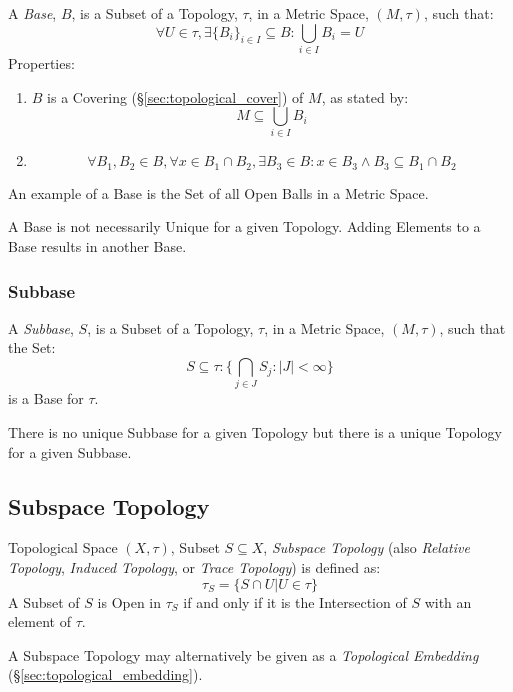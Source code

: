 A \emph{Base}, $B$, is a Subset of a Topology, $\tau$, in a Metric
Space, $(M,\tau)$, such that:
\[
  \forall U \in \tau, \exists \{B_i\}_{i \in I} \subseteq B :
  \bigcup_{i \in I}B_i = U
\]
Properties:
\begin{enumerate}
  \item $B$ is a Covering (\S\ref{sec:topological_cover}) of $M$, as
    stated by:
\[
  M \subseteq \bigcup_{i \in I} B_i
\]

  \item
\[
  \forall B_1, B_2 \in B, \forall x \in B_1 \cap B_2,
  \exists B_3 \in B : x \in B_3 \wedge B_3 \subseteq B_1 \cap B_2
\]

\end{enumerate}
An example of a Base is the Set of all Open Balls in a Metric Space.

A Base is not necessarily Unique for a given Topology. Adding Elements
to a Base results in another Base.



\subsubsection{Subbase}\label{sec:subbase}

A \emph{Subbase}, $S$, is a Subset of a Topology, $\tau$, in a Metric
Space, $(M,\tau)$, such that the Set:
\[
  S \subseteq \tau : \{ \bigcap_{j \in J} S_j : |J| < \infty \}
\]
is a Base for $\tau$.

There is no unique Subbase for a given Topology but there is a unique
Topology for a given Subbase.



\subsection{Subspace Topology}\label{sec:subspace_topology}

Topological Space $(X,\tau)$, Subset $S \subseteq X$, \emph{Subspace
  Topology} (also \emph{Relative Topology}, \emph{Induced Topology},
or \emph{Trace Topology}) is defined as:
\[
  \tau_S = \{ S \cap U | U \in \tau \}
\]
A Subset of $S$ is Open in $\tau_S$ if and only if it is the
Intersection of $S$ with an element of $\tau$.

A Subspace Topology may alternatively be given as a \emph{Topological
  Embedding} (\S\ref{sec:topological_embedding}).

